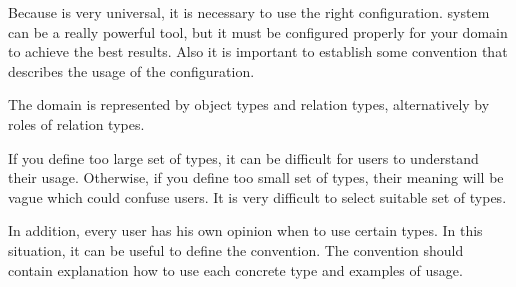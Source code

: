 
Because \textan{} is very universal, it is necessary to use the right
configuration. \textan{} system can be a really powerful tool, but it must be
configured properly for your domain to achieve the best results. Also it is
important to establish some convention that describes the usage of the
configuration.

The domain is represented by object types and relation types, alternatively by
roles of relation types. 

If you define too large set of types, it can be difficult for users to understand
their usage. Otherwise, if you define too small set of types, their meaning will
be vague which could confuse users. It is very difficult to select suitable set
of types.

In addition, every user has his own opinion when to use certain types. In this
situation, it can be useful to define the convention. The convention should
contain explanation how to use each concrete type and examples of usage.
